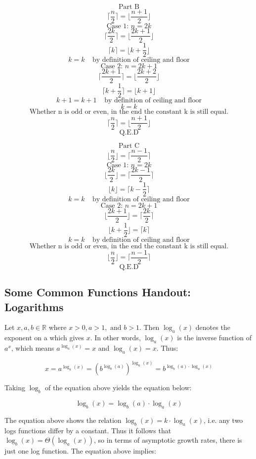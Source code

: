 \documentclass{article}
\begin{document}
$$\text{Part B}$$
$$\lceil \frac{n}{2} \rceil = \lfloor \frac{n + 1}{2} \rfloor$$
$$\text{Case 1: } n = 2k$$
$$\lceil \frac{2k}{2} \rceil = \lfloor \frac{2k + 1}{2} \rfloor$$
$$\lceil k \rceil = \lfloor k + \frac{1}{2} \rfloor$$
$$ k  = k \;\;\;\;\text{by definition of ceiling and floor}$$
$$\text{Case 2: } n = 2k + 1$$
$$\lceil \frac{2k + 1}{2} \rceil = \lfloor \frac{2k + 2}{2} \rfloor$$
$$\lceil k + \frac{1}{2} \rceil = \lfloor k + 1 \rfloor$$
$$k + 1 =  k + 1 \;\;\;\;\text{by definition of ceiling and floor}$$
$$k = k$$
$$\text{Whether n is odd or even, in the end the constant k is still equal.}$$
$$\lceil \frac{n}{2} \rceil = \lfloor \frac{n + 1}{2} \rfloor$$
$$\text{Q.E.D}$$

$$\text{Part C}$$
$$\lfloor \frac{n}{2} \rfloor = \lceil \frac{n - 1}{2} \rceil$$
$$\text{Case 1: } n = 2k$$
$$\lfloor \frac{2k}{2} \rfloor = \lceil \frac{2k - 1}{2} \rceil$$
$$\lfloor k \rfloor = \lceil k - \frac{1}{2} \rceil$$
$$k = k\;\;\;\;\text{by definition of ceiling and floor}$$
$$\text{Case 2: } n = 2k + 1$$
$$\lfloor \frac{2k + 1}{2} \rfloor = \lceil \frac{2k}{2} \rceil$$
$$\lfloor k + \frac{1}{2} \rfloor = \lceil k \rceil$$
$$k = k \;\;\;\;\text{by definition of ceiling and floor}$$
$$\text{Whether n is odd or even, in the end the constant k is still equal.}$$
$$\lfloor \frac{n}{2} \rfloor = \lceil \frac{n - 1}{2} \rceil$$
$$\text{Q.E.D}$$

\subsection{Some Common Functions Handout: Logarithms}
Let $x,a,b \in \mathbb{R}$ where $x > 0, a > 1, \text{ and } b > 1$. Then $\log_{a}(x)$ denotes the exponent on a which gives $x$. In other words, $\log_{a}(x)$ is the inverse function of $a^x$, which means $a^{\log_{a}(x)} = x$ and $\log_{a}(x) = x$. Thus:

$$x = a^{\log_{a}(x)} = (b^{\log_{b}(a)})^{\log_{a}(x)} = b^{\log_{b}(a) \cdot \log_{a}(x)}$$

Taking $\log_{b}$ of the equation above yields the equation below:

$$\log_{b}(x) = \log_{b}(a) \cdot \log_{a}(x)$$

The equation above shows the relation $\log_{b}(x) = k \cdot \log_{a}(x)$, i.e. any two logs functions differ by a constant. Thus it follows that $\log_{b}(x) = \Theta(\log_{a}(x))$, so in terms of asymptotic growth rates, there is just one log function. The equation above implies:
\end{document}
